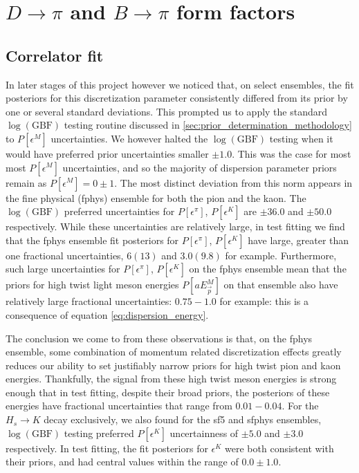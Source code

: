 \chapter{$D \rightarrow \pi$ and $B \rightarrow \pi$ form factors}\label{cha:DBtopi}

\section{Correlator fit}\label{sec:Hpi_corrfuncs}
In later stages of this project however we noticed that, on select ensembles, the fit posteriors for this discretization parameter consistently differed from its prior by one or several standard deviations.  This prompted us to apply the standard $\log(\mathrm{GBF})$ testing routine discussed in \ref{sec:prior_determination_methodology} to $P[\epsilon^M]$ uncertainties.  We however halted the $\log(\mathrm{GBF})$ testing when it would have preferred prior uncertainties smaller $\pm1.0$.  This was the case for most most $P[\epsilon^M]$ uncertainties, and so the majority of dispersion parameter priors remain as $P[\epsilon^M] = 0\pm1$.  The most distinct deviation from this norm appears in the fine physical (fphys) ensemble for both the pion and the kaon.  The $\log(\mathrm{GBF})$ preferred uncertainties for $P[\epsilon^{\pi}]$, $P[\epsilon^{K}]$ are $\pm 36.0$ and $\pm50.0$ respectively.  While these uncertainties are relatively large, in test fitting we find that the fphys ensemble fit posteriors for $P[\epsilon^{\pi}]$, $P[\epsilon^{K}]$ have large, greater than one fractional uncertainties, $6(13)$ and $3.0(9.8)$ for example.  Furthermore, such large uncertainties for $P[\epsilon^{\pi}]$, $P[\epsilon^{K}]$ on the fphys ensemble mean that the priors for high twist light meson energies $P[aE^M_{\vec{p}}]$ on that ensemble also have relatively large fractional uncertainties: $0.75-1.0$ for example: this is a consequence of equation \ref{eq:dispersion_energy}.  

The conclusion we come to from these observations is that, on the fphys ensemble, some combination of momentum related discretization effects greatly reduces our ability to set justifiably narrow priors for high twist pion and kaon energies.  Thankfully, the signal from these high twist meson energies is strong enough that in test fitting, despite their broad priors, the posteriors of these energies have fractional uncertainties that range from $0.01-0.04$.  For the $H_s\rightarrow K$ decay exclusively, we also found for the sf5 and sfphys ensembles, $\log(\mathrm{GBF})$ testing preferred $P[\epsilon^{K}]$ uncertainness of $\pm5.0$ and $\pm3.0$ respectively.  In test fitting, the fit posteriors for $\epsilon^{K}$ were both consistent with their priors, and had central values within the range of $0.0\pm1.0$.

